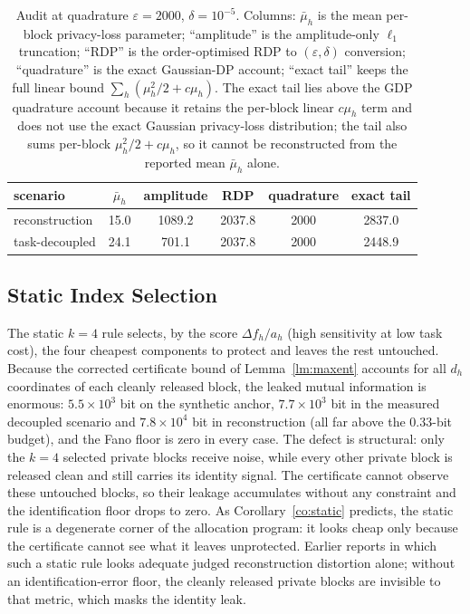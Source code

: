 \documentclass{ieeetj}
\theoremstyle{plain}
\theoremstyle{definition}
\begin{document}
\begin{table}[t]
\centering\footnotesize
\setlength{\tabcolsep}{3.0pt}
\caption{Audit at quadrature $\varepsilon{=}2000$, $\delta{=}10^{-5}$.
Columns: $\bar\mu_h$ is the mean per-block privacy-loss parameter;
``amplitude'' is the amplitude-only $\ell_1$ truncation; ``RDP'' is the
order-optimised RDP to $(\varepsilon,\delta)$ conversion; ``quadrature'' is the
exact Gaussian-DP account; ``exact tail'' keeps the full linear bound
$\sum_h(\mu_h^2/2+c\mu_h)$. The exact tail lies above the GDP quadrature
account because it retains the per-block linear $c\mu_h$ term and does not use
the exact Gaussian privacy-loss distribution; the tail also sums per-block
$\mu_h^2/2+c\mu_h$, so it cannot be reconstructed from the reported mean
$\bar\mu_h$ alone.}
\label{tab:audit}
\begin{tabular}{lccccc}
\toprule
scenario & $\bar\mu_h$ & amplitude & RDP & quadrature & exact tail \\
\midrule
reconstruction & 15.0 & 1089.2 & 2037.8 & 2000 & 2837.0 \\
task-decoupled & 24.1 & 701.1 & 2037.8 & 2000 & 2448.9 \\
\bottomrule
\end{tabular}
\end{table}

\subsection{Static Index Selection}

The static $k=4$ rule selects, by the score $\Delta f_h/a_h$ (high sensitivity
at low task cost), the four cheapest components to protect and leaves the rest
untouched. Because the corrected certificate bound of Lemma~\ref{lm:maxent}
accounts for all $d_h$ coordinates of each cleanly released block, the leaked
mutual information is enormous: $5.5\times10^{3}$ bit on the synthetic anchor,
$7.7\times10^{3}$ bit in the measured decoupled scenario and $7.8\times10^{4}$ bit
in reconstruction (all far above the $0.33$-bit budget), and the Fano floor is
zero in every case. The defect is structural: only the $k=4$
selected private blocks receive noise, while every other private block is
released clean and still carries its identity signal. The certificate cannot
observe these untouched blocks, so their leakage accumulates without any
constraint and the identification floor drops to zero. As
Corollary~\ref{co:static} predicts, the
static rule is a degenerate corner of the allocation program: it looks cheap
only because the certificate cannot see what it leaves unprotected. Earlier
reports in which such a static rule looks adequate judged reconstruction
distortion alone; without an identification-error floor, the cleanly released
private blocks are invisible to that metric, which masks the identity leak.
\end{document}
